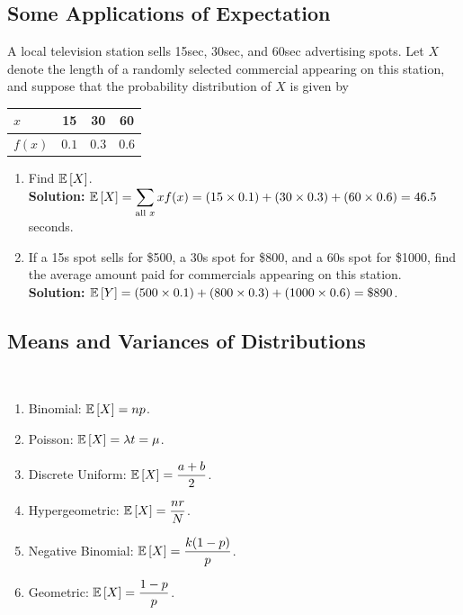 \subsection{Some Applications of Expectation}

\begin{example}
    A local television station sells 15sec, 30sec, and 60sec advertising spots. Let $X$ denote the length of a randomly selected commercial appearing on this
    station, and suppose that the probability distribution of $X$ is given by
    \begin{center}
        \begin{tabular}{l|*{3}{c}}
            $x$ & 15 & 30 & 60 \\
            \hline
            $f(x)$ & $0.1$ & $0.3$ & $0.6$ \\
        \end{tabular}
    \end{center}

    \begin{enumerate}[label=(\alph*)]
        \item Find $\mathbb{E}\left[{X}\right]$. \\
        \textbf{Solution:} $\mathbb{E}\left[{X}\right] = \displaystyle \sum_{\text{all $x$}} xf(x) = (15 \times 0.1) + (30 \times 0.3) + (60 \times 0.6) = 46.5$ seconds.
        \item If a 15s spot sells for \$500, a 30s spot for \$800, and a 60s spot for \$1000, find the average amount paid for commercials appearing on this station. \\
        \textbf{Solution:} $\mathbb{E}\left[{Y}\right] = (500 \times 0.1) + (800 \times 0.3) + (1000 \times 0.6) = \$890$. \\
    \end{enumerate}
    
\end{example}

\subsection{Means and Variances of Distributions}

\begin{definition}
    \phantom{}\
    \begin{enumerate}
        \item Binomial: $\mathbb{E}\left[{X}\right] = np$.
        \item Poisson: $\mathbb{E}\left[{X}\right] = \lambda t = \mu$.
        \item Discrete Uniform: $\mathbb{E}\left[{X}\right] = \displaystyle \frac{a+b}{2}$.
        \item Hypergeometric: $\mathbb{E}\left[{X}\right] = \displaystyle \frac{nr}{N}$.
        \item Negative Binomial: $\mathbb{E}\left[{X}\right] = \displaystyle \frac{k(1-p)}{p}$.
        \item Geometric: $\mathbb{E}\left[{X}\right] = \displaystyle \frac{1-p}{p}$.
    \end{enumerate}
\end{definition}

